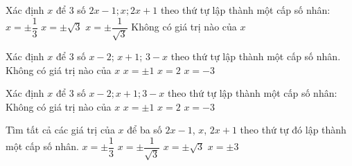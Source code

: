 \begin{ex}%
	Xác định $x$  để $3$ số $2x-1; x; 2x+1$ theo thứ tự lập thành một cấp số nhân:
	\choice 
		 {$x=\pm \dfrac{1}{3}$}
		 {$x=\pm \sqrt{3}$}
		 {\True $x=\pm \dfrac{1}{\sqrt{3}}$}
		{Không có giá trị  nào của $x$}
\end{ex}

\begin{ex}%
	 Xác định $x$ để $3$ số $x - 2$; $x + 1$; $3 - x$ theo thứ tự lập thành một cấp số nhân.
	 \choice
		{\True Không có  giá trị nào của $x$}
		{$x  = \pm 1$}
		{$x  = 2$}
		 {$x = -3$}
\end{ex}

\begin{ex}%
	Xác định $x$ để $3$ số $x-2;  x+1; 3-x$ theo thứ tự lập thành một cấp số nhân:
	\choice 
		{\True Không có giá trị  nào của $x$}
		{$x=\pm  1$}
		 {$x=2$}
		 {$x=-3$}
\end{ex}

\begin{ex}%
	Tìm tất cả các giá  trị của $x$ để ba số $2x-1$, $x$, $2x+1$ theo thứ tự đó lập thành một cấp số nhân.
	 \choice
		{$x=\pm\dfrac{1}{3}$} 
		 {\True $x=\pm\dfrac{1}{\sqrt 3}$}
		 {$x=\pm\sqrt 3 $}
		{$x=\pm  3$}
\end{ex}

